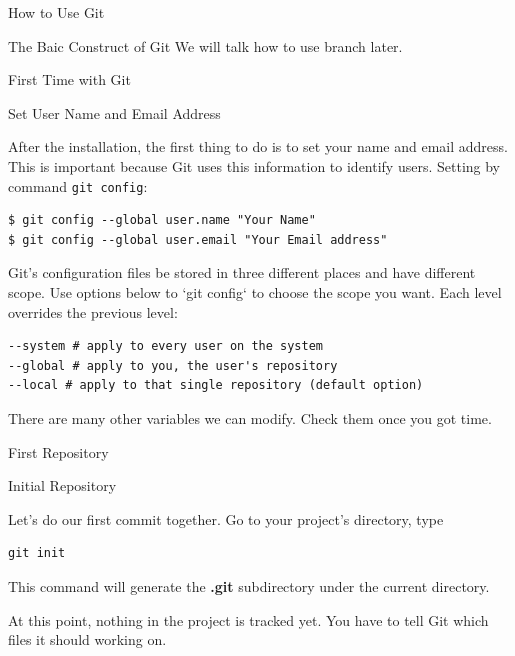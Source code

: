\documentclass[12pt, a4papaer]{article}
\begin{document}
\begin{section}{How to Use Git}
\begin{subsection}{The Baic Construct of Git}
We will talk how to use branch later.
    
\end{subsection}

\begin{subsection}{First Time with Git}

\begin{subsubsection}{Set User Name and Email Address}

After the installation, the first thing to do is to set your name and email
address. This is important because Git uses this information to identify users.
Setting by command \verb+git config+:

\begin{lstlisting}
$ git config --global user.name "Your Name"
$ git config --global user.email "Your Email address"
\end{lstlisting}

Git's configuration files be stored in three different places and have different
scope. Use options below to `git config` to choose the scope you want. Each
level overrides the previous level:

\begin{lstlisting}
--system # apply to every user on the system
--global # apply to you, the user's repository
--local # apply to that single repository (default option)
\end{lstlisting}

There are many other variables we can modify. Check them once you got time.
\end{subsubsection}

\begin{subsubsection}{First Repository}
\begin{paragraph}{Initial Repository\\}
    
Let's do our first commit together. Go to your project's directory, type 

\begin{lstlisting}
git init
\end{lstlisting}

This command will generate the \textbf{.git} subdirectory under the current directory.


At this point, nothing in the project is tracked yet. You have to tell Git
which files it should working on.


\end{paragraph}
\end{subsubsection}
\end{subsection}
\end{section}
\end{document}
